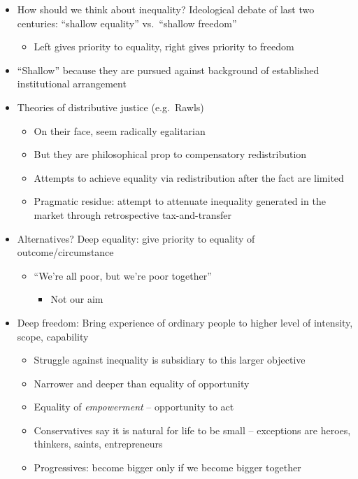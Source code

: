 \begin{itemize}
\tightlist
\item
  How should we think about inequality? Ideological debate of last two
  centuries: ``shallow equality'' vs.~``shallow freedom''

  \begin{itemize}
  \tightlist
  \item
    Left gives priority to equality, right gives priority to freedom
  \end{itemize}
\item
  ``Shallow'' because they are pursued against background of established
  institutional arrangement
\item
  Theories of distributive justice (e.g.~Rawls)

  \begin{itemize}
  \tightlist
  \item
    On their face, seem radically egalitarian
  \item
    But they are philosophical prop to compensatory redistribution
  \item
    Attempts to achieve equality via redistribution after the fact are
    limited
  \item
    Pragmatic residue: attempt to attenuate inequality generated in the
    market through retrospective tax-and-transfer
  \end{itemize}
\item
  Alternatives? Deep equality: give priority to equality of
  outcome/circumstance

  \begin{itemize}
  \tightlist
  \item
    ``We're all poor, but we're poor together''

    \begin{itemize}
    \tightlist
    \item
      Not our aim
    \end{itemize}
  \end{itemize}
\item
  Deep freedom: Bring experience of ordinary people to higher level of
  intensity, scope, capability

  \begin{itemize}
  \tightlist
  \item
    Struggle against inequality is subsidiary to this larger objective
  \item
    Narrower and deeper than equality of opportunity
  \item
    Equality of \emph{empowerment} -- opportunity to act
  \item
    Conservatives say it is natural for life to be small -- exceptions
    are heroes, thinkers, saints, entrepreneurs
  \item
    Progressives: become bigger only if we become bigger together


\end{itemize}
\end{itemize}

